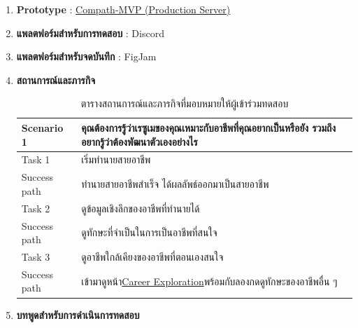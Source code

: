 \begin{enumerate}
    \item \textbf{Prototype} : \href{https://compath-cpe.web.app/}{Compath-MVP (Production Server)}
    \item \textbf{แพลตฟอร์มสำหรับการทดสอบ} : Discord
    \item \textbf{แพลตฟอร์มสำหรับจดบันทึก} : FigJam
    \item \textbf{สถานการณ์และภารกิจ}
          \begin{table}[H]
              \caption{ตารางสถานการณ์และภารกิจที่มอบหมายให้ผู้เข้าร่วมทดสอบ}
              \label{tab:scenarioUT}
              \begin{tabularx}{\textwidth}{|l|X|}
                  \hline
                  \textbf{Scenario 1} & \textbf{คุณต้องการรู้ว่าเรซูเมของคุณเหมาะกับอาชีพที่คุณอยากเป็นหรือยัง รวมถึงอยากรู้ว่าต้องพัฒนาตัวเองอย่างไร} \\ \hline
                  Task 1              & เริ่มทำนายสายอาชีพ                                                                          \\ \hline
                  Success path        & ทำนายสายอาชีพสำเร็จ ได้ผลลัพธ์ออกมาเป็นสายอาชีพ                                                  \\ \hline
                  Task 2              & ดูข้อมูลเชิงลึกของอาชีพที่ทำนายได้                                                                \\ \hline
                  Success path        & ดูทักษะที่จำเป็นในการเป็นอาชีพที่สนใจ                                                             \\ \hline
                  Task 3              & ดูอาชีพใกล้เคียงของอาชีพที่ตอนเองสนใจ                                                          \\ \hline
                  Success path        & เข้ามาดูหน้า\hyperref[subsec:Career Exploration]{Career Exploration}พร้อมกับลองกดดูทักษะของอาชีพอื่น ๆ                                           \\ \hline
              \end{tabularx}
          \end{table}
    \item \textbf{บทพูดสำหรับการดำเนินการทดสอบ}
          \begin{figure}[H]\centering

\end{figure}
\end{enumerate}

